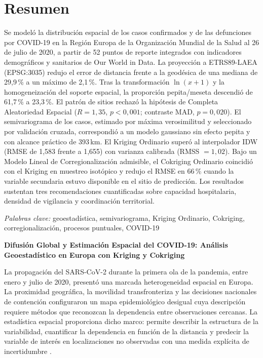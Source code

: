 \documentclass[12pt,a4paper]{article}
\begin{document}
\section{Resumen}
\noindent Se modeló la distribución espacial de los casos confirmados y de las defunciones por COVID-19 en la Región Europa de la Organización Mundial de la Salud al 26 de julio de 2020, a partir de 52 puntos de reporte integrados con indicadores demográficos y sanitarios de Our World in Data. La proyección a ETRS89-LAEA (EPSG:3035) redujo el error de distancia frente a la geodésica de una mediana de 29,9\,\% a un máximo de 2,1\,\%. Tras la transformación $\ln(x+1)$ y la homogeneización del soporte espacial, la proporción pepita/meseta descendió de 61,7\,\% a 23,3\,\%. El patrón de sitios rechazó la hipótesis de Completa Aleatoriedad Espacial ($R=1{,}35$, $p<0{,}001$; contraste MAD, $p=0{,}020$). El semivariograma de los casos, estimado por máxima verosimilitud y seleccionado por validación cruzada, correspondió a un modelo gaussiano sin efecto pepita y con alcance práctico de 393\,km. El Kriging Ordinario superó al interpolador IDW (RMSE de 1,583 frente a 1,655) con varianza calibrada (RMSS $=1{,}02$). Bajo un Modelo Lineal de Corregionalización admisible, el Cokriging Ordinario coincidió con el Kriging en muestreo isotópico y redujo el RMSE en 66\,\% cuando la variable secundaria estuvo disponible en el sitio de predicción. Los resultados sustentan tres recomendaciones cuantificadas sobre capacidad hospitalaria, densidad de vigilancia y coordinación territorial.

\par\hspace*{1.27cm}\textit{Palabras clave:} geoestadística, semivariograma, Kriging Ordinario, Cokriging, corregionalización, procesos puntuales, COVID-19
\clearpage

\begin{center}\textbf{Difusión Global y Estimación Espacial del COVID-19: Análisis Geoestadístico en Europa con Kriging y Cokriging}\end{center}

La propagación del SARS-CoV-2 durante la primera ola de la pandemia, entre enero y julio de 2020, presentó una marcada heterogeneidad espacial en Europa. La proximidad geográfica, la movilidad transfronteriza y las decisiones nacionales de contención configuraron un mapa epidemiológico desigual cuya descripción requiere métodos que reconozcan la dependencia entre observaciones cercanas. La estadística espacial proporciona dicho marco: permite describir la estructura de la variabilidad, cuantificar la dependencia en función de la distancia y predecir la variable de interés en localizaciones no observadas con una medida explícita de incertidumbre \citep{cressie1993,diggle1998}.
\end{document}
